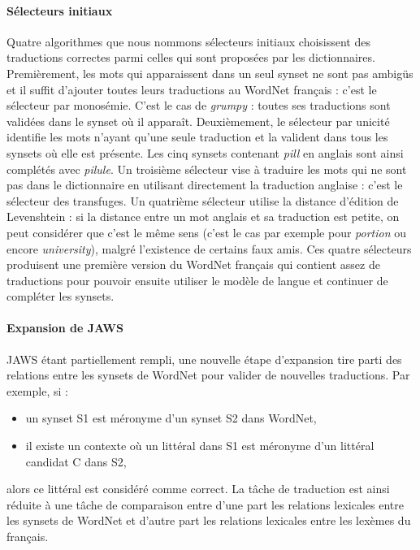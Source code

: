 \paragraph{Sélecteurs initiaux} Quatre algorithmes que nous nommons sélecteurs initiaux choisissent des traductions correctes parmi celles qui sont proposées par les dictionnaires. Premièrement, les mots qui apparaissent dans un seul synset ne sont pas ambigüs et il suffit d'ajouter toutes leurs traductions au WordNet français : c'est le sélecteur par monosémie. C'est le cas de \textit{grumpy} : toutes ses traductions sont validées dans le synset où il apparaît. Deuxièmement, le sélecteur par unicité identifie les mots n'ayant qu'une seule traduction et la valident dans tous les synsets où elle est présente. Les cinq synsets contenant \textit{pill} en anglais sont ainsi complétés avec \textit{pilule}. Un troisième sélecteur vise à traduire les mots qui ne sont pas dans le dictionnaire en utilisant directement la traduction anglaise : c'est le sélecteur des transfuges. Un quatrième sélecteur utilise la distance d'édition de Levenshtein : si la distance entre un mot anglais et sa traduction est petite, on peut considérer que c'est le même sens (c'est le cas par exemple pour \textit{portion} ou encore \textit{university}), malgré l'existence de certains faux amis. Ces quatre sélecteurs produisent une première version du WordNet français qui contient assez de traductions pour pouvoir ensuite utiliser le modèle de langue et continuer de compléter les synsets.

\paragraph{Expansion de JAWS} JAWS étant partiellement rempli, une nouvelle étape d'expansion tire parti des relations entre les synsets de WordNet pour valider de nouvelles traductions. Par exemple, si :

\begin{itemize}
    \item un synset S1 est méronyme d'un synset S2 dans WordNet,
    \item il existe un contexte où un littéral dans S1 est méronyme d'un littéral candidat C dans S2,
\end{itemize}
alors ce littéral est considéré comme correct. La tâche de traduction est ainsi réduite à une tâche de comparaison entre d'une part les relations lexicales entre les synsets de WordNet et d'autre part les relations lexicales entre les lexèmes du français.

